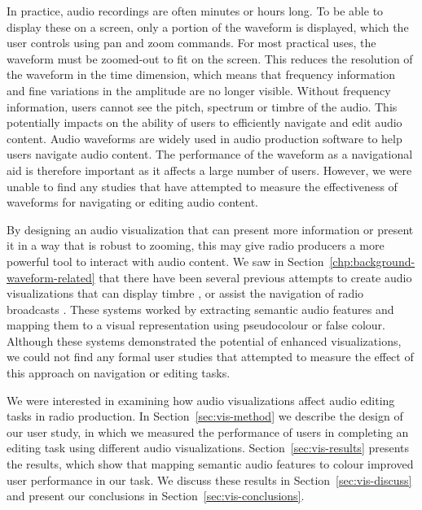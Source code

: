 In practice, audio recordings are often minutes or hours long. To be able to display these on a screen, only a portion
of the waveform is displayed, which the user controls using pan and zoom commands.  For most practical uses, the
waveform must be zoomed-out to fit on the screen. This reduces the resolution of the waveform in the time dimension,
which means that frequency information and fine variations in the amplitude are no longer visible.  Without frequency
information, users cannot see the pitch, spectrum or timbre of the audio.  This potentially impacts on the ability of
users to efficiently navigate and edit audio content.  Audio waveforms are widely used in audio production software to
help users navigate audio content. The performance of the waveform as a navigational aid is therefore 
important as it affects a large number of users.  However, we were unable to find any studies that have attempted to
measure the effectiveness of waveforms for navigating or editing audio content.

By designing an audio visualization that can present more information or present it in a way that is robust to zooming,
this may give radio producers a more powerful tool to interact with audio content. We saw in
Section~\ref{chp:background-waveform-related} that there have been several previous attempts to create audio
visualizations that can display timbre \citep{Tzanetakis2000,Rice2005}, or assist the navigation of radio broadcasts
\citep{Mason2007}.  These systems worked by extracting semantic audio features and mapping them to a visual
representation using pseudocolour or false colour. Although these systems demonstrated the potential of enhanced
visualizations, we could not find any formal user studies that attempted to measure the effect of this approach on
navigation or editing tasks.

We were interested in examining how audio visualizations affect audio editing tasks in radio production. In
Section~\ref{sec:vis-method} we describe the design of our user study, in which we measured the performance of users in
completing an editing task using different audio visualizations. Section~\ref{sec:vis-results} presents the results,
which show that mapping semantic audio features to colour improved user performance in our task. We discuss these
results in Section~\ref{sec:vis-discuss} and present our conclusions in Section~\ref{sec:vis-conclusions}.



